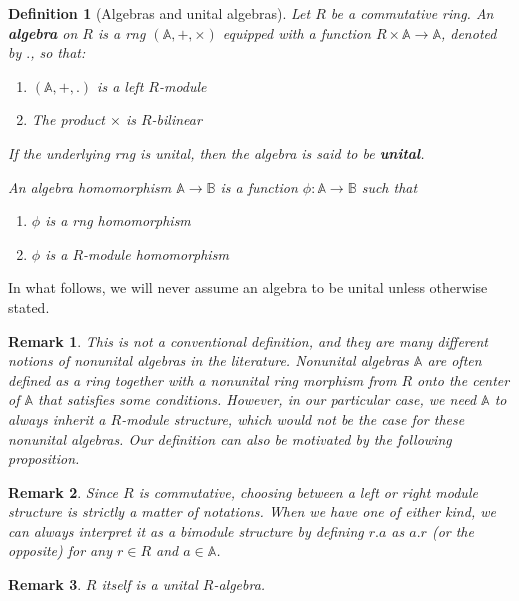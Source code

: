 \documentclass[a4paper,fleqn]{cas-sc}
\newtheorem{rem}{Remark}%
\newtheorem{dfnt}{Definition}%
\newcommand{\bA}{\mathbb{A}}
\newcommand{\bB}{\mathbb{B}}
\begin{document}
\begin{dfnt}[Algebras and unital algebras]
    Let $R$ be a commutative ring.
    An \textbf{algebra} on $R$ is a rng $(\bA ,+, \times)$ equipped with a function $R \times \bA \to \bA$, denoted by $.$, so that:
    \begin{enumerate}
        \item[(i)] $(\bA,+,.)$ is a left $R$-module
        \item[(iv)] The product $\times$ is $R$-bilinear
    \end{enumerate}
    If the underlying rng is unital, then the algebra is said to be \textbf{unital}.
    
    An algebra homomorphism $\bA \to \bB$ is a function $\phi : \bA \to \bB$ such that
    \begin{enumerate}
        \item[(i)] $\phi$ is a rng homomorphism
        \item[(ii)] $\phi$ is a $R$-module homomorphism
    \end{enumerate}
\end{dfnt}

In what follows, we will never assume an algebra to be unital unless otherwise stated.

\begin{rem}
This is not a conventional definition, and they are many different notions of nonunital algebras in the literature. Nonunital algebras $\bA$ are often defined as a ring together with a nonunital ring morphism from $R$ onto the center of $\bA$ that satisfies some conditions. However, in our particular case, we need $\bA$ to always inherit a $R$-module structure, which would not be the case for these nonunital algebras. Our definition can also be motivated by the following proposition.
\end{rem}

\begin{rem}
Since $R$ is commutative, choosing between a left or right module structure is strictly a matter of notations. When we have one of either kind, we can always interpret it as a bimodule structure by defining $r.a$ as $a.r$ (or the opposite) for any $r\in R$ and $a \in \bA$.
\end{rem}

\begin{rem}
$R$ itself is a unital $R$-algebra.
\end{rem}
\end{document}
